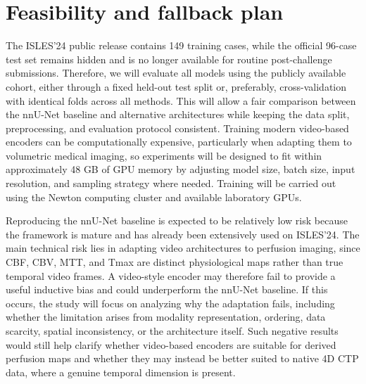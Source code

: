 \section{Feasibility and fallback plan}
The ISLES'24 public release contains 149 training cases, while the official 96-case test set remains hidden and is no longer available for routine post-challenge submissions. Therefore, we will evaluate all models using the publicly available cohort, either through a fixed held-out test split or, preferably, cross-validation with identical folds across all methods. This will allow a fair comparison between the nnU-Net baseline and alternative architectures while keeping the data split, preprocessing, and evaluation protocol consistent. Training modern video-based encoders can be computationally expensive, particularly when adapting them to volumetric medical imaging, so experiments will be designed to fit within approximately 48 GB of GPU memory by adjusting model size, batch size, input resolution, and sampling strategy where needed. Training will be carried out using the Newton computing cluster and available laboratory GPUs.

Reproducing the nnU-Net baseline is expected to be relatively low risk because the framework is mature and has already been extensively used on ISLES'24. The main technical risk lies in adapting video architectures to perfusion imaging, since CBF, CBV, MTT, and Tmax are distinct physiological maps rather than true temporal video frames. A video-style encoder may therefore fail to provide a useful inductive bias and could underperform the nnU-Net baseline. If this occurs, the study will focus on analyzing why the adaptation fails, including whether the limitation arises from modality representation, ordering, data scarcity, spatial inconsistency, or the architecture itself. Such negative results would still help clarify whether video-based encoders are suitable for derived perfusion maps and whether they may instead be better suited to native 4D CTP data, where a genuine temporal dimension is present.